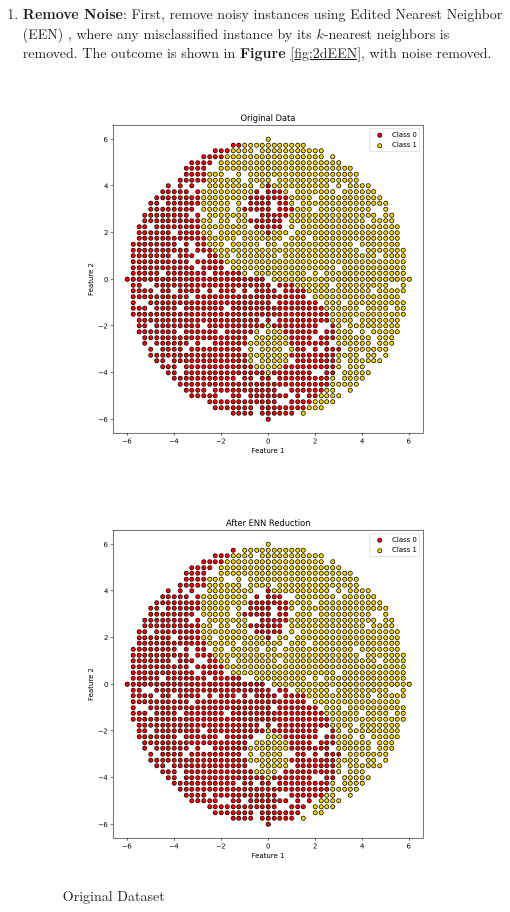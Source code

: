 \begin{enumerate}
	\item \textbf{Remove Noise}: First, remove noisy instances using Edited Nearest Neighbor (EEN) \cite{wilson1972asymptotic}, where any misclassified instance by its $k$-nearest neighbors is removed. The outcome is shown in \textbf{Figure} \ref{fig:2dEEN}, with noise removed.
	
	\begin{figure}[ht]
		\centering
		\begin{minipage}{0.3\textwidth}
			\centering
			\includegraphics[width=\textwidth]{figures/DROP3/2dDataset}
			\caption{Original Dataset}
			\label{fig:2dDataset}
		\end{minipage}\hfill
		\begin{minipage}{0.3\textwidth}
			\centering
			\includegraphics[width=\textwidth]{figures/DROP3/2dEEN}

\end{minipage}
\end{figure}
\end{enumerate}
